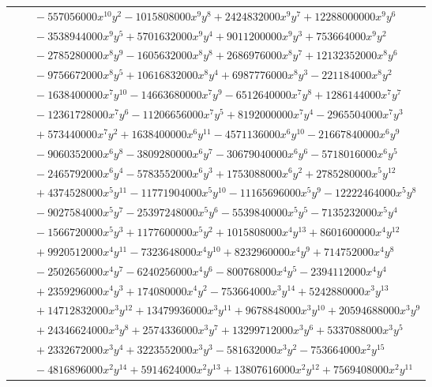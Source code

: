 \documentclass[11pt]{article}
\begin{document}
\begin{longtable}{@{}ll@{}}
 & $\quad -557056000x^{10}y^{2}-1015808000x^{9}y^{8}+2424832000x^{9}y^{7}+12288000000x^{9}y^{6}$\\
 & $\quad -3538944000x^{9}y^{5}+5701632000x^{9}y^{4}+9011200000x^{9}y^{3}+753664000x^{9}y^{2}$\\
 & $\quad -2785280000x^{8}y^{9}-1605632000x^{8}y^{8}+2686976000x^{8}y^{7}+12132352000x^{8}y^{6}$\\
 & $\quad -9756672000x^{8}y^{5}+10616832000x^{8}y^{4}+6987776000x^{8}y^{3}-221184000x^{8}y^{2}$\\
 & $\quad -1638400000x^{7}y^{10}-14663680000x^{7}y^{9}-6512640000x^{7}y^{8}+1286144000x^{7}y^{7}$\\
 & $\quad -12361728000x^{7}y^{6}-11206656000x^{7}y^{5}+8192000000x^{7}y^{4}-2965504000x^{7}y^{3}$\\
 & $\quad +573440000x^{7}y^{2}+1638400000x^{6}y^{11}-4571136000x^{6}y^{10}-21667840000x^{6}y^{9}$\\
 & $\quad -9060352000x^{6}y^{8}-3809280000x^{6}y^{7}-30679040000x^{6}y^{6}-5718016000x^{6}y^{5}$\\
 & $\quad -2465792000x^{6}y^{4}-5783552000x^{6}y^{3}+1753088000x^{6}y^{2}+2785280000x^{5}y^{12}$\\
 & $\quad +4374528000x^{5}y^{11}-11771904000x^{5}y^{10}-11165696000x^{5}y^{9}-12222464000x^{5}y^{8}$\\
 & $\quad -9027584000x^{5}y^{7}-25397248000x^{5}y^{6}-5539840000x^{5}y^{5}-7135232000x^{5}y^{4}$\\
 & $\quad -1566720000x^{5}y^{3}+1177600000x^{5}y^{2}+1015808000x^{4}y^{13}+8601600000x^{4}y^{12}$\\
 & $\quad +9920512000x^{4}y^{11}-7323648000x^{4}y^{10}+8232960000x^{4}y^{9}+714752000x^{4}y^{8}$\\
 & $\quad -2502656000x^{4}y^{7}-6240256000x^{4}y^{6}-800768000x^{4}y^{5}-2394112000x^{4}y^{4}$\\
 & $\quad +2359296000x^{4}y^{3}+174080000x^{4}y^{2}-753664000x^{3}y^{14}+5242880000x^{3}y^{13}$\\
 & $\quad +14712832000x^{3}y^{12}+13479936000x^{3}y^{11}+9678848000x^{3}y^{10}+20594688000x^{3}y^{9}$\\
 & $\quad +24346624000x^{3}y^{8}+2574336000x^{3}y^{7}+13299712000x^{3}y^{6}+5337088000x^{3}y^{5}$\\
 & $\quad +2332672000x^{3}y^{4}+3223552000x^{3}y^{3}-581632000x^{3}y^{2}-753664000x^{2}y^{15}$\\
 & $\quad -4816896000x^{2}y^{14}+5914624000x^{2}y^{13}+13807616000x^{2}y^{12}+7569408000x^{2}y^{11}$\\

\end{longtable}
\end{document}
